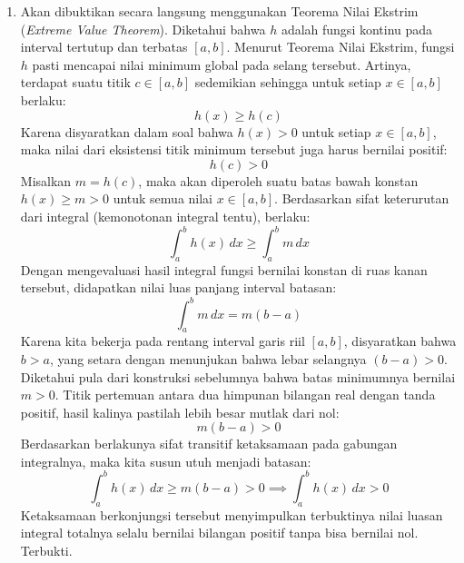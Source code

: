 \documentclass[11pt,letterpaper]{article}
\begin{document}
\begin{enumerate}
  \item Akan dibuktikan secara langsung menggunakan Teorema Nilai Ekstrim (\textit{Extreme Value Theorem}).
        Diketahui bahwa $h$ adalah fungsi kontinu pada interval tertutup dan terbatas $[a,b]$. Menurut Teorema Nilai Ekstrim, fungsi $h$ pasti mencapai nilai minimum global pada selang tersebut. Artinya, terdapat suatu titik $c \in [a,b]$ sedemikian sehingga untuk setiap $x \in [a,b]$ berlaku:
        \[ h(x) \geq h(c) \]
        Karena disyaratkan dalam soal bahwa $h(x) > 0$ untuk setiap $x \in [a,b]$, maka nilai dari eksistensi titik minimum tersebut juga harus bernilai positif:
        \[ h(c) > 0 \]
        Misalkan $m = h(c)$, maka akan diperoleh suatu batas bawah konstan $h(x) \geq m > 0$ untuk semua nilai $x \in [a,b]$.
        Berdasarkan sifat keterurutan dari integral (kemonotonan integral tentu), berlaku:
        \[ \int_a^b h(x) \, dx \geq \int_a^b m \, dx \]
        Dengan mengevaluasi hasil integral fungsi bernilai konstan di ruas kanan tersebut, didapatkan nilai luas panjang interval batasan:
        \[ \int_a^b m \, dx = m(b - a) \]
        Karena kita bekerja pada rentang interval garis riil $[a,b]$, disyaratkan bahwa $b > a$, yang setara dengan menunjukan bahwa lebar selangnya $(b - a) > 0$. Diketahui pula dari konstruksi sebelumnya bahwa batas minimumnya bernilai $m > 0$. Titik pertemuan antara dua himpunan bilangan real dengan tanda positif, hasil kalinya pastilah lebih besar mutlak dari nol:
        \[ m(b - a) > 0 \]
        Berdasarkan berlakunya sifat transitif ketaksamaan pada gabungan integralnya, maka kita susun utuh menjadi batasan:
        \[ \int_a^b h(x) \, dx \ge m(b - a) > 0 \implies \int_a^b h(x) \, dx > 0 \]
        Ketaksamaan berkonjungsi tersebut menyimpulkan terbuktinya nilai luasan integral totalnya selalu bernilai bilangan positif tanpa bisa bernilai nol. Terbukti.
\end{enumerate}
\end{document}
